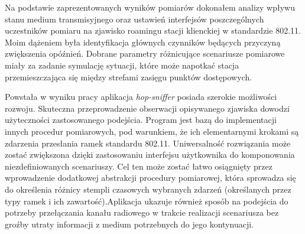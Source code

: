 
Na podstawie zaprezentowanych wyników pomiarów dokonałem analizy wpływu stanu medium transmisyjnego oraz ustawień interfejsów poszczególnych uczestników pomiaru na zjawisko roamingu stacji klienckiej w standardzie 802.11. Moim dążeniem była identyfikacja głównych czynników będących przyczyną zwiększenia opóźnień. Dobrane parametry różnicujące scenariusze pomiarowe miały za zadanie symulację sytuacji, które może napotkać stacja przemieszczająca się między strefami zasięgu punktów dostępowych.

Powstała w wyniku pracy aplikacja \emph{hop-sniffer} posiada szerokie możliwości rozwoju. Skuteczna przeprowadzenie obserwacji opisywanego zjawiska dowodzi użyteczności zastosowanego podejścia. Program jest bazą do implementacji innych procedur pomiarowych, pod warunkiem, że ich elementarnymi krokami są zdarzenia przesłania ramek standardu 802.11. Uniwersalność rozwiązania może zostać zwiększona dzięki zastosowaniu interfejsu użytkownika do komponowania niezdefiniowanych scenariuszy. Cel ten może zostać łatwo osiągnięty przez wprowadzenie dodatkowej abstrakcji procedury pomiarowej, która sprowadza się do określenia różnicy stempli czasowych wybranych zdarzeń (określanych przez typy ramek i ich zawartość).Aplikacja ukazuje również sposób na podejścia do potrzeby przełączania kanału radiowego w trakcie realizacji scenariusza bez groźby utraty informacji z medium potrzebnych do jego kontynuacji.  
